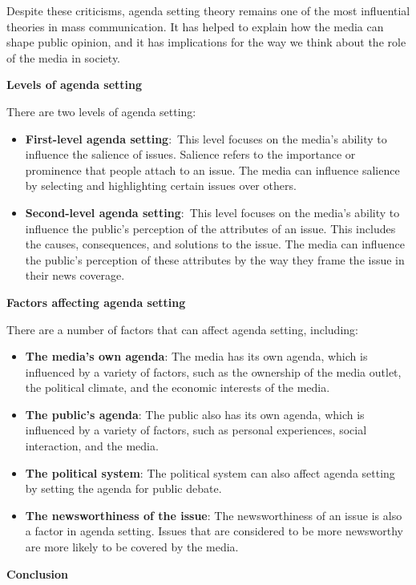 \documentclass[
  b5paper]{book}
\begin{document}
Despite these criticisms, agenda setting theory remains one of the most influential theories in mass communication. It has helped to explain how the media can shape public opinion, and it has implications for the way we think about the role of the media in society.

\textbf{Levels of agenda setting}

There are two levels of agenda setting:

\begin{itemize}
\item
  \textbf{First-level agenda setting}:~This level focuses on the media's ability to influence the salience of issues. Salience refers to the importance or prominence that people attach to an issue. The media can influence salience by selecting and highlighting certain issues over others.
\item
  \textbf{Second-level agenda setting}:~This level focuses on the media's ability to influence the public's perception of the attributes of an issue. This includes the causes, consequences, and solutions to the issue. The media can influence the public's perception of these attributes by the way they frame the issue in their news coverage.
\end{itemize}

\textbf{Factors affecting agenda setting}

There are a number of factors that can affect agenda setting, including:

\begin{itemize}
\item
  \textbf{The media's own agenda}: The media has its own agenda, which is influenced by a variety of factors, such as the ownership of the media outlet, the political climate, and the economic interests of the media.
\item
  \textbf{The public's agenda}: The public also has its own agenda, which is influenced by a variety of factors, such as personal experiences, social interaction, and the media.
\item
  \textbf{The political system}: The political system can also affect agenda setting by setting the agenda for public debate.
\item
  \textbf{The newsworthiness of the issue}: The newsworthiness of an issue is also a factor in agenda setting. Issues that are considered to be more newsworthy are more likely to be covered by the media.
\end{itemize}

\textbf{Conclusion}
\end{document}

